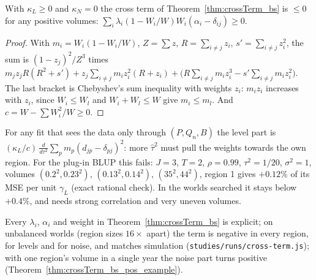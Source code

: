 \begin{theorem}\label{thm:crossTerm_bs_level_nonpos}
  \leanok
  With $\kappa_L \ge 0$ and $\kappa_N = 0$ the cross term of Theorem~\ref{thm:crossTerm_bs} is $\le 0$ for any
  positive volumes: $\sum_i \lambda_i (1 - W_i/W) W_i (\alpha_i - \delta_{ij}) \ge 0$.
\end{theorem}
\begin{proof}
  \leanok
  With $m_i = W_i(1 - W_i/W)$, $Z = \sum z$, $R = \sum_{i \ne j} z_i$, $s' = \sum_{i \ne j} z_i^2$, the sum is
  $(1 - z_j)^2/Z^3$ times
  $m_j z_j R (R^2 + s') + z_j \sum_{i \ne j} m_i z_i^2 (R + z_i) + \bigl(R \sum_{i \ne j} m_i z_i^3 - s' \sum_{i \ne j} m_i z_i^2\bigr)$.
  The last bracket is Chebyshev's sum inequality with weights $z_i$: $m_i z_i$ increases with $z_i$, since
  $W_i \le W_l$ and $W_i + W_l \le W$ give $m_i \le m_l$. And $c = W - \sum W_i^2/W \ge 0$.
\end{proof}

\begin{remark}
  For any fit that sees the data only through $(P, Q_n, B)$ the level part is
  $(\kappa_L/c)\, \tfrac{d}{d\tau^2} \sum_p m_p (d_{jp} - \delta_{pj})^2$: more $\hat\tau^2$ must pull the weights towards
  the own region. For the plug-in BLUP this fails: $J = 3$, $T = 2$, $\rho = 0.99$, $\tau^2 = 1/20$, $\sigma^2 = 1$,
  volumes $(0.2^2, 0.23^2)$, $(0.13^2, 0.14^2)$, $(35^2, 44^2)$, region 1 gives $+0.12\%$ of its MSE per unit $\gamma_L$
  (exact rational check). In the worlds searched it stays below $+0.4\%$, and needs strong correlation and
  very uneven volumes.
\end{remark}

\begin{remark}
  Every $\lambda_i$, $\alpha_i$ and weight in Theorem~\ref{thm:crossTerm_bs} is explicit; on unbalanced worlds
  (region sizes $16\times$ apart) the term is negative in every region, for levels and for noise, and
  matches simulation (\texttt{studies/runs/cross-term.js}); with one region's volume in a single year the
  noise part turns positive (Theorem~\ref{thm:crossTerm_bs_pos_example}).
\end{remark}

